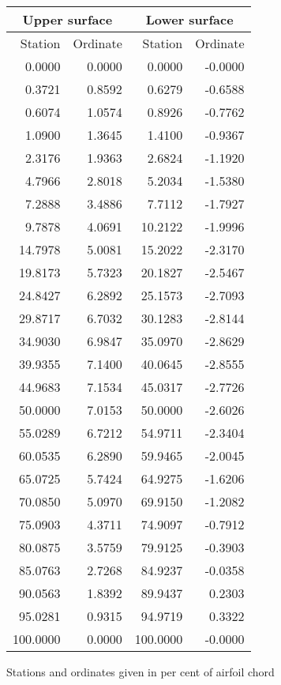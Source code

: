 \documentclass[11pt]{book}
\begin{document}
 \hspace{4mm}
 \begin{tabular}{|r|r|r|r|} \hline 
 \multicolumn{2}{|c|}{Upper surface} & \multicolumn{2}{|c|}{Lower surface} \\
 \hline
 Station & Ordinate & Station & Ordinate \\
 \hline
0.0000 & 0.0000 & 0.0000 & -0.0000 \\
0.3721 & 0.8592 & 0.6279 & -0.6588 \\
0.6074 & 1.0574 & 0.8926 & -0.7762 \\
1.0900 & 1.3645 & 1.4100 & -0.9367 \\
2.3176 & 1.9363 & 2.6824 & -1.1920 \\
4.7966 & 2.8018 & 5.2034 & -1.5380 \\
7.2888 & 3.4886 & 7.7112 & -1.7927 \\
9.7878 & 4.0691 & 10.2122 & -1.9996 \\
14.7978 & 5.0081 & 15.2022 & -2.3170 \\
19.8173 & 5.7323 & 20.1827 & -2.5467 \\
24.8427 & 6.2892 & 25.1573 & -2.7093 \\
29.8717 & 6.7032 & 30.1283 & -2.8144 \\
34.9030 & 6.9847 & 35.0970 & -2.8629 \\
39.9355 & 7.1400 & 40.0645 & -2.8555 \\
44.9683 & 7.1534 & 45.0317 & -2.7726 \\
50.0000 & 7.0153 & 50.0000 & -2.6026 \\
55.0289 & 6.7212 & 54.9711 & -2.3404 \\
60.0535 & 6.2890 & 59.9465 & -2.0045 \\
65.0725 & 5.7424 & 64.9275 & -1.6206 \\
70.0850 & 5.0970 & 69.9150 & -1.2082 \\
75.0903 & 4.3711 & 74.9097 & -0.7912 \\
80.0875 & 3.5759 & 79.9125 & -0.3903 \\
85.0763 & 2.7268 & 84.9237 & -0.0358 \\
90.0563 & 1.8392 & 89.9437 & 0.2303 \\
95.0281 & 0.9315 & 94.9719 & 0.3322 \\
100.0000 & 0.0000 & 100.0000 & -0.0000 \\
 \hline 
 \end{tabular}
 \vspace{8mm}

Stations and ordinates given in per cent of airfoil chord
\end{document}
